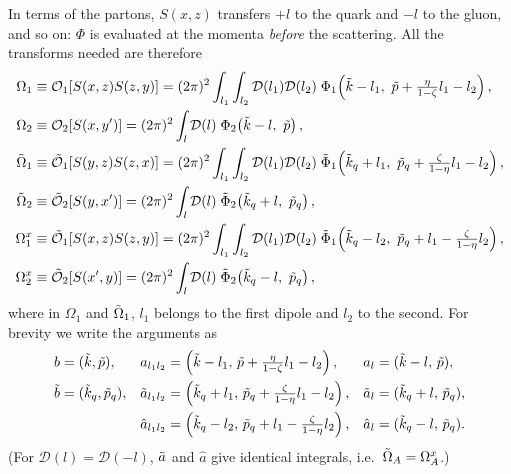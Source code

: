 \documentclass[9pt]{article}
\numberwithin{equation}{section}
\begin{document}
In terms of the partons, $S(x,z)$ transfers $+l$ to the quark and $-l$ to the gluon, and so on: $\Phi$ is evaluated at the momenta \emph{before} the scattering. All the transforms needed are therefore
\begin{align}\label{eq:Omega}
    \Omega_{1} & \equiv \mathcal{O}_{1}[S(x,z)S(z,y)] = (2\pi)^{2}\int_{l_{1}}\int_{l_{2}}\mathcal{D}(l_{1})\mathcal{D}(l_{2})\;\Phi_{1}\!\left(\Tilde{k}-l_{1},\ \Tilde{p}+\tfrac{\eta}{1-\zeta}l_{1}-l_{2}\right), \notag \\
    \Omega_{2} & \equiv\mathcal{O}_{2}[S(x,y')] = (2\pi)^{2}\int_{l}\mathcal{D}(l)\;\Phi_{2}\!\left(\Tilde{k}-l,\ \Tilde{p}\right),\notag \\
    \Tilde{\Omega}_{1} & \equiv \Tilde{\mathcal{O}}_{1}[S(y,z)S(z,x)] = (2\pi)^{2}\int_{l_{1}}\int_{l_{2}}\mathcal{D}(l_{1})\mathcal{D}(l_{2})\;\Tilde{\Phi}_{1}\!\left(\Tilde{k}_{q}+l_{1},\ \Tilde{p}_{q}+\tfrac{\zeta}{1-\eta}l_{1}-l_{2}\right), \notag \\
    \Tilde{\Omega}_{2} & \equiv\Tilde{\mathcal{O}}_{2}[S(y,x')] = (2\pi)^{2}\int_{l}\mathcal{D}(l)\;\Tilde{\Phi}_{2}\!\left(\Tilde{k}_{q}+l,\ \Tilde{p}_{q}\right),\notag \\
    \Omega^{x}_{1} & \equiv \Tilde{\mathcal{O}}_{1}[S(x,z)S(z,y)] = (2\pi)^{2}\int_{l_{1}}\int_{l_{2}}\mathcal{D}(l_{1})\mathcal{D}(l_{2})\;\Tilde{\Phi}_{1}\!\left(\Tilde{k}_{q}-l_{2},\ \Tilde{p}_{q}+l_{1}-\tfrac{\zeta}{1-\eta}l_{2}\right), \notag \\
    \Omega^{x}_{2} & \equiv\Tilde{\mathcal{O}}_{2}[S(x',y)] = (2\pi)^{2}\int_{l}\mathcal{D}(l)\;\Tilde{\Phi}_{2}\!\left(\Tilde{k}_{q}-l,\ \Tilde{p}_{q}\right),
\end{align}
where in $\Omega_{1}$ and $\Tilde{\Omega}_{1}$, $l_{1}$ belongs to the first dipole and $l_{2}$ to the second. For brevity we write the arguments as
\begin{align}\label{eq:args}
    b & =(\Tilde{k},\Tilde{p}), & a_{l_{1}l_{2}} & =\left(\Tilde{k}-l_{1},\,\Tilde{p}+\tfrac{\eta}{1-\zeta}l_{1}-l_{2}\right), & a_{l} & =(\Tilde{k}-l,\,\Tilde{p}),\notag \\
    \Tilde{b} & =(\Tilde{k}_{q},\Tilde{p}_{q}), & \Tilde{a}_{l_{1}l_{2}} & =\left(\Tilde{k}_{q}+l_{1},\,\Tilde{p}_{q}+\tfrac{\zeta}{1-\eta}l_{1}-l_{2}\right), & \Tilde{a}_{l} & =(\Tilde{k}_{q}+l,\,\Tilde{p}_{q}),\notag \\
    & & \hat{a}_{l_{1}l_{2}} & =\left(\Tilde{k}_{q}-l_{2},\,\Tilde{p}_{q}+l_{1}-\tfrac{\zeta}{1-\eta}l_{2}\right), & \hat{a}_{l} & =(\Tilde{k}_{q}-l,\,\Tilde{p}_{q}).
\end{align}
(For $\mathcal{D}(l)=\mathcal{D}(-l)$, $\Tilde{a}$ and $\hat{a}$ give identical integrals, i.e.\ $\Tilde{\Omega}_{A}=\Omega^{x}_{A}$.)
\end{document}

